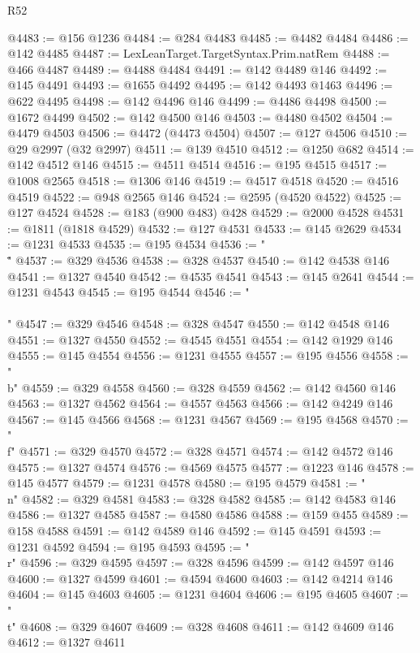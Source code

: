 \begin{lexlean}{R52}
\begin{coremodule}
@4483 := @156 @1236
@4484 := @284 @4483
@4485 := @4482 @4484
@4486 := @142 @4485
@4487 := LexLeanTarget.TargetSyntax.Prim.natRem
@4488 := @466 @4487
@4489 := @4488 @4484
@4491 := @142 @4489 @146
@4492 := @145 @4491
@4493 := @1655 @4492
@4495 := @142 @4493 @1463
@4496 := @622 @4495
@4498 := @142 @4496 @146
@4499 := @4486 @4498
@4500 := @1672 @4499
@4502 := @142 @4500 @146
@4503 := @4480 @4502
@4504 := @4479 @4503
@4506 := @4472 (@4473 @4504)
@4507 := @127 @4506
@4510 := @29 @2997 (@32 @2997)
@4511 := @139 @4510
@4512 := @1250 @682
@4514 := @142 @4512 @146
@4515 := @4511 @4514
@4516 := @195 @4515
@4517 := @1008 @2565
@4518 := @1306 @146
@4519 := @4517 @4518
@4520 := @4516 @4519
@4522 := @948 @2565 @146
@4524 := @2595 (@4520 @4522)
@4525 := @127 @4524
@4528 := @183 (@900 @483) @428
@4529 := @2000 @4528
@4531 := @1811 (@1818 @4529)
@4532 := @127 @4531
@4533 := @145 @2629
@4534 := @1231 @4533
@4535 := @195 @4534
@4536 := "\\\""
@4537 := @329 @4536
@4538 := @328 @4537
@4540 := @142 @4538 @146
@4541 := @1327 @4540
@4542 := @4535 @4541
@4543 := @145 @2641
@4544 := @1231 @4543
@4545 := @195 @4544
@4546 := "\\\\"
@4547 := @329 @4546
@4548 := @328 @4547
@4550 := @142 @4548 @146
@4551 := @1327 @4550
@4552 := @4545 @4551
@4554 := @142 @1929 @146
@4555 := @145 @4554
@4556 := @1231 @4555
@4557 := @195 @4556
@4558 := "\\b"
@4559 := @329 @4558
@4560 := @328 @4559
@4562 := @142 @4560 @146
@4563 := @1327 @4562
@4564 := @4557 @4563
@4566 := @142 @4249 @146
@4567 := @145 @4566
@4568 := @1231 @4567
@4569 := @195 @4568
@4570 := "\\f"
@4571 := @329 @4570
@4572 := @328 @4571
@4574 := @142 @4572 @146
@4575 := @1327 @4574
@4576 := @4569 @4575
@4577 := @1223 @146
@4578 := @145 @4577
@4579 := @1231 @4578
@4580 := @195 @4579
@4581 := "\\n"
@4582 := @329 @4581
@4583 := @328 @4582
@4585 := @142 @4583 @146
@4586 := @1327 @4585
@4587 := @4580 @4586
@4588 := @159 @455
@4589 := @158 @4588
@4591 := @142 @4589 @146
@4592 := @145 @4591
@4593 := @1231 @4592
@4594 := @195 @4593
@4595 := "\\r"
@4596 := @329 @4595
@4597 := @328 @4596
@4599 := @142 @4597 @146
@4600 := @1327 @4599
@4601 := @4594 @4600
@4603 := @142 @4214 @146
@4604 := @145 @4603
@4605 := @1231 @4604
@4606 := @195 @4605
@4607 := "\\t"
@4608 := @329 @4607
@4609 := @328 @4608
@4611 := @142 @4609 @146
@4612 := @1327 @4611

\end{coremodule}
\end{lexlean}
